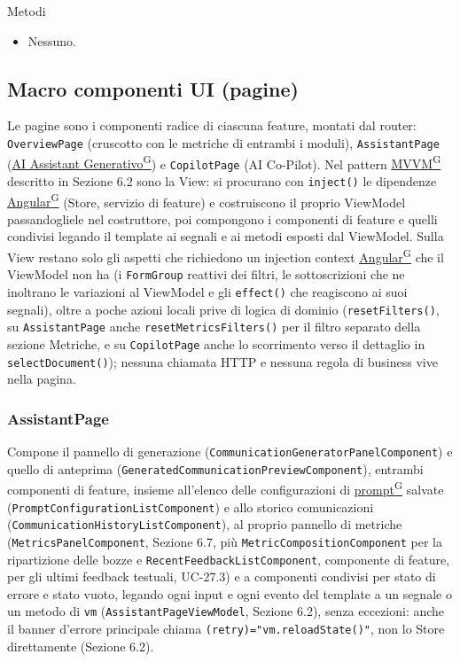\documentclass[a4paper,12pt]{article}
\providecommand{\glslink}[2]{\href{https://alittlebyte-19.github.io/Documentazione/glossario.html\#gls-#1}{\underline{#2}\textsuperscript{\scriptsize G}}}
\begin{document}
\begin{sloppypar}
Metodi
\begin{itemize}\raggedright
    \item Nessuno.
\end{itemize}

\subsection{Macro componenti UI (pagine)}

Le pagine sono i componenti radice di ciascuna feature, montati dal router: \texttt{OverviewPage} (cruscotto con le metriche di entrambi i moduli), \texttt{AssistantPage} (\glslink{ai-assistant-generativo-ai-assistant}{AI Assistant Generativo}) e \texttt{CopilotPage} (AI Co-Pilot). Nel pattern \glslink{mvvm-model-view-viewmodel}{MVVM} descritto in Sezione 6.2 sono la View: si procurano con \texttt{inject()} le dipendenze \glslink{angular}{Angular} (Store, servizio di feature) e costruiscono il proprio ViewModel passandogliele nel costruttore, poi compongono i componenti di feature e quelli condivisi legando il template ai segnali e ai metodi esposti dal ViewModel. Sulla View restano solo gli aspetti che richiedono un injection context \glslink{angular}{Angular} che il ViewModel non ha (i \texttt{FormGroup} reattivi dei filtri, le sottoscrizioni che ne inoltrano le variazioni al ViewModel e gli \texttt{effect()} che reagiscono ai suoi segnali), oltre a poche azioni locali prive di logica di dominio (\texttt{resetFilters()}, su \texttt{AssistantPage} anche \texttt{resetMetricsFilters()} per il filtro separato della sezione Metriche, e su \texttt{CopilotPage} anche lo scorrimento verso il dettaglio in \texttt{selectDocument()}); nessuna chiamata HTTP e nessuna regola di business vive nella pagina.

\subsubsection{AssistantPage}

Compone il pannello di generazione (\texttt{CommunicationGeneratorPanelComponent}) e quello di anteprima (\texttt{GeneratedCommunicationPreviewComponent}), entrambi componenti di feature, insieme all'elenco delle configurazioni di \glslink{prompt}{prompt} salvate (\texttt{PromptConfigurationListComponent}) e allo storico comunicazioni (\texttt{CommunicationHistoryListComponent}), al proprio pannello di metriche (\texttt{MetricsPanelComponent}, Sezione 6.7, più \texttt{MetricCompositionComponent} per la ripartizione delle bozze e \texttt{RecentFeedbackListComponent}, componente di feature, per gli ultimi feedback testuali, UC-27.3) e a componenti condivisi per stato di errore e stato vuoto, legando ogni input e ogni evento del template a un segnale o un metodo di \texttt{vm} (\texttt{AssistantPageViewModel}, Sezione 6.2), senza eccezioni: anche il banner d'errore principale chiama \texttt{(retry)="vm.reloadState()"}, non lo Store direttamente (Sezione 6.2).


\end{sloppypar}
\end{document}
